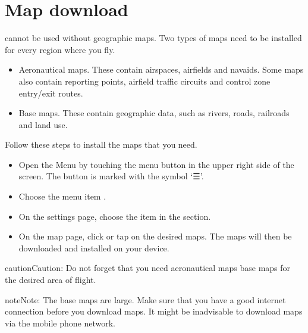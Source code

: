 \documentclass[letterpaper,10pt,english]{sphinxmanual}
\begin{document}
\section{Map download}
\label{\detokenize{01-intro/02-getting_started:map-download}}
\sphinxAtStartPar
{} cannot be used without geographic maps.  Two types
of maps need to be installed for every region where you fly.
\begin{itemize}
\item {} 
\sphinxAtStartPar
Aeronautical maps.  These contain airspaces, airfields and navaids.  Some maps
also contain reporting points, airfield traffic circuits and control zone
entry/exit routes.

\item {} 
\sphinxAtStartPar
Base maps.  These contain geographic data, such as rivers, roads, railroads
and land use.

\end{itemize}

\sphinxAtStartPar
Follow these steps to install the maps that you need.
\begin{itemize}
\item {} 
\sphinxAtStartPar
Open the Menu by touching the menu button in the upper right side of the
screen.  The button is marked with the symbol ‘☰’.

\item {} 
\sphinxAtStartPar
Choose the menu item .

\item {} 
\sphinxAtStartPar
On the settings page, choose the item  in the  section.

\item {} 
\sphinxAtStartPar
On the map page, click or tap on the desired maps.  The maps will then be
downloaded and installed on your device.

\end{itemize}

\begin{sphinxadmonition}{caution}{Caution:}
\sphinxAtStartPar
Do not forget that you need aeronautical maps  base maps for
the desired area of flight.
\end{sphinxadmonition}

\begin{sphinxadmonition}{note}{Note:}
\sphinxAtStartPar
The base maps are large.  Make sure that you have a good internet
connection before you download maps.  It might be inadvisable to download
maps via the mobile phone network.
\end{sphinxadmonition}
\end{document}

